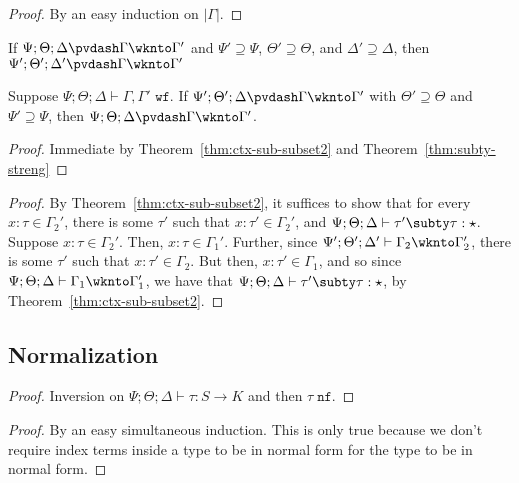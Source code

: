 \ctxsubsubset*
\begin{proof}
By an easy induction on $|\Gamma|$.
\end{proof}

\begin{theorem}
If $\Psi ; \Theta ; \Delta \pvdash \Gamma \wknto \Gamma'$ and $\Psi' \supseteq \Psi$, $\Theta' \supseteq \Theta$, and $\Delta' \supseteq \Delta$, then
$\Psi' ; \Theta' ; \Delta' \pvdash \Gamma \wknto \Gamma'$
\label{thm:ctx-sub-wkn}
\end{theorem}

\begin{theorem}
Suppose $\Psi ; \Theta ; \Delta \vdash \Gamma,\Gamma' \texttt{ wf}$.
If $\Psi' ; \Theta' ; \Delta \pvdash \Gamma \wknto \Gamma'$ with $\Theta' \supseteq \Theta$ and $\Psi' \supseteq \Psi$, then $\Psi ; \Theta ; \Delta \pvdash \Gamma \wknto \Gamma'$.
\end{theorem}
\label{thm:ctx-sub-streng}
\begin{proof}
Immediate by Theorem~\ref{thm:ctx-sub-subset2} and Theorem~\ref{thm:subty-streng}
\end{proof}

\ctxsubswap*
\begin{proof}
By Theorem~\ref{thm:ctx-sub-subset2}, it suffices to show that for every $x : \tau \in \Gamma_2'$, there is some $\tau'$ such that $x : \tau' \in \Gamma_2'$,
and $\Psi ; \Theta ; \Delta \vdash \tau' \subty \tau : \star$. Suppose $x : \tau \in \Gamma_2'$. Then, $x : \tau \in \Gamma_1'$. Further, since $\Psi' ; \Theta' ;  \Delta' \vdash \Gamma_2 \wknto \Gamma_2'$, there is some $\tau'$ such that $x : \tau' \in \Gamma_2$. But then, $x : \tau' \in \Gamma_1$, and so since  $\Psi ; \Theta ; \Delta \vdash \Gamma_1 \wknto \Gamma_1'$, we have that $\Psi ; \Theta ; \Delta \vdash \tau' \subty \tau : \star$, by Theorem~\ref{thm:ctx-sub-subset2}.
\end{proof}

\subsection{Normalization}

\canonforms*
\begin{proof}
Inversion on $\Psi ;\Theta ; \Delta \vdash \tau : S \to K$  and then $\tau \; \texttt{nf}$.
\end{proof}

\idxsubstnf*
\begin{proof}
By an easy simultaneous induction. This is only true because we don't require index terms inside a type to be in normal form for the type to be in normal form.
\end{proof}

